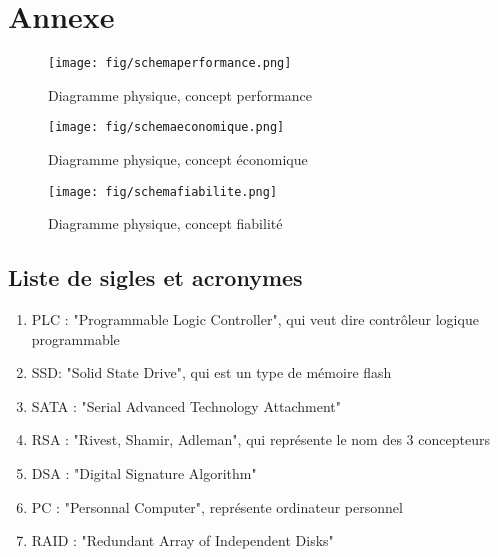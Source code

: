 \chapter{Annexe}

\begin{figure}[!ht]
\centering
\texttt{[image: fig/schemaperformance.png]}
\caption{Diagramme physique, concept \og performance \fg}
\label{schema_performance}
\end{figure}
\begin{figure}[!ht]
\texttt{[image: fig/schemaeconomique.png]}
\caption{Diagramme physique, concept \og \'economique \fg}
\label{schema_economique}
\end{figure}
\begin{figure}[!ht]
\texttt{[image: fig/schemafiabilite.png]}
\caption{Diagramme physique, concept \og fiabilit\'e \fg}
\label{schema_fiabilite}
\end{figure}
\clearpage

\section{Liste de sigles et acronymes}
\begin{enumerate}
\item PLC : "Programmable Logic Controller", qui veut dire contr\^oleur logique programmable
\item SSD: "Solid State Drive", qui est un type de m\'emoire flash
\item SATA : "Serial Advanced Technology Attachment"
\item RSA : "Rivest, Shamir, Adleman", qui repr\'esente le nom des 3 concepteurs
\item DSA : "Digital Signature Algorithm" 
\item PC : "Personnal Computer", repr\'esente ordinateur personnel
\item RAID : "Redundant Array of Independent Disks"
\end{enumerate}